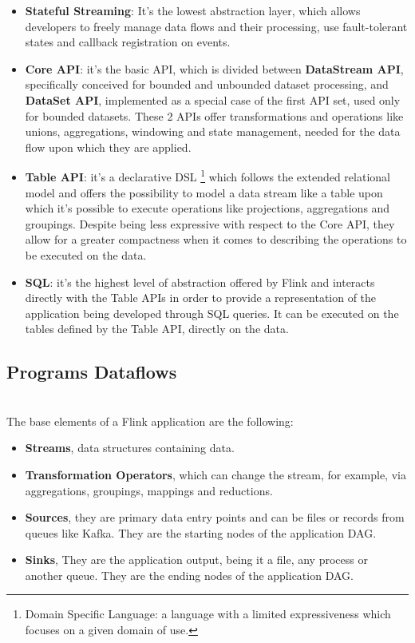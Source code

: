 \begin{itemize}
	\item \textbf{Stateful Streaming}: It's the lowest abstraction layer, which allows developers to freely manage data flows and their processing, use fault-tolerant states and callback registration on events.
	\item \textbf{Core API}: it's the basic API, which is divided between \textbf{DataStream API}, specifically conceived for bounded and unbounded dataset processing, and \textbf{DataSet API}, implemented as a special case of the first API set, used only for bounded datasets. These 2 APIs offer transformations and operations like unions, aggregations, windowing and state management, needed for the data flow upon which they are applied.
	\item \textbf{Table API}: it's a declarative DSL \footnote{Domain Specific Language: a language with a limited expressiveness which focuses on a given domain of use.} which follows the extended relational model and offers the possibility to model a data stream like a table upon which it's possible to execute operations like projections, aggregations and groupings. Despite being less expressive with respect to the Core API, they allow for a greater compactness when it comes to describing the operations to be executed on the data.
	\item \textbf{SQL}: it's the highest level of abstraction offered by Flink and interacts directly with the Table APIs in order to provide a representation of the application being developed through SQL queries. It can be executed on the tables defined by the Table API, directly on the data.
\end{itemize}

\subsection{Programs Dataflows}  \label{ProgramsDataflows} ~\\

The base elements of a Flink application are the following:

\begin{itemize}
	\item \textbf{Streams}, data structures containing data.
	\item \textbf{Transformation Operators}, which can change the stream, for example, via aggregations, groupings, mappings and reductions.
	\item \textbf{Sources}, they are primary data entry points and can be files or records from queues like Kafka. They are the starting nodes of the application DAG.
    \item \textbf{Sinks}, They are the application output, being it a file, any process or another queue. They are the ending nodes of the application DAG.
\end{itemize}

